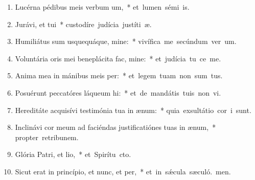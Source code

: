 \begin{flushleft}
\begin{enumerate}[leftmargin=*]

\item Lucérna pédibus meis verbum um,~* \mbox{et lumen sémi is.}
\item Jurávi, et tui~* \mbox{custodíre judícia justíti æ.}
\item Humiliátus sum usquequáque, mine:~* \mbox{vivífica me secúndum ver um.}
\item Voluntária oris mei beneplácita fac, mine:~* \mbox{et judícia tu ce me.}
\item Anima mea in mánibus meis per:~* \mbox{et legem tuam non sum tus.}
\item Posuérunt peccatóres láqueum hi:~* \mbox{et de mandátis tuis non vi.}
\item Hereditáte acquisívi testimónia tua in ænum:~* \mbox{quia exsultátio cor i sunt.}
\item Inclinávi cor meum ad faciéndas justificatiónes tuas in ænum,~* \mbox{propter retribunem.}
\item Glória Patri, et lio,~* \mbox{et Spirítu cto.}
\item Sicut erat in princípio, et nunc, et per,~* \mbox{et in s\'{\ae}cula sæculó. men.}

\end{enumerate}
\end{flushleft}

